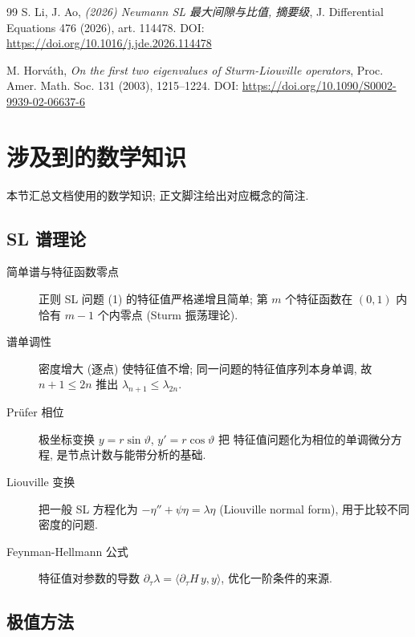 \documentclass[UTF8]{ctexart}
\begin{document}
\begin{thebibliography}{99}
 S. Li, J. Ao, \emph{(2026) Neumann SL 最大间隙与比值, 摘要级},
	J. Differential Equations 476 (2026), art. 114478.
	DOI: \url{https://doi.org/10.1016/j.jde.2026.114478}

 M. Horv\'ath, \emph{On the first two eigenvalues of Sturm-Liouville
	operators}, Proc. Amer. Math. Soc. 131 (2003), 1215--1224.
	DOI: \url{https://doi.org/10.1090/S0002-9939-02-06637-6}

\end{thebibliography}

\section{涉及到的数学知识}

本节汇总文档使用的数学知识; 正文脚注给出对应概念的简注.

\subsection{SL 谱理论}

\begin{description}
	\item[简单谱与特征函数零点] 正则 SL 问题 (1) 的特征值严格递增且简单;
		第 $m$ 个特征函数在 $(0,1)$ 内恰有 $m-1$ 个内零点 (Sturm 振荡理论).
	\item[谱单调性] 密度增大 (逐点) 使特征值不增; 同一问题的特征值序列本身单调,
		故 $n+1 \leq 2n$ 推出 $\lambda_{n+1} \leq \lambda_{2n}$.
	\item[Pr\"ufer 相位] 极坐标变换 $y = r\sin\vartheta$, $y' = r\cos\vartheta$ 把
		特征值问题化为相位的单调微分方程, 是节点计数与能带分析的基础.
	\item[Liouville 变换] 把一般 SL 方程化为 $-\eta'' + \psi\eta = \lambda\eta$
		(Liouville normal form), 用于比较不同密度的问题.
	\item[Feynman-Hellmann 公式] 特征值对参数的导数 $\partial_\tau \lambda = \langle \partial_\tau H \, y, y\rangle$,
		优化一阶条件的来源.
\end{description}

\subsection{极值方法}
\end{document}

